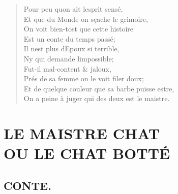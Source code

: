\documentclass[14pt,a4paper]{memoir}
\begin{document}
\begin{otherlanguage}{french}
\begin{verse}
  \small
Pour peu qu\textquotesingle on ait l\textquotesingle esprit sensé, \\
Et que du Monde on sçache le grimoire, \\
On voit bien-tost que cette histoire \\
Est un conte du temps passé; \\
Il n\textquotesingle est plus d\textquotesingle Epoux si terrible, \\
Ny qui demande l\textquotesingle impossible; \\
Fut-il mal-content \& jaloux, \\
Prés de sa femme on le voit filer doux; \\
Et de quelque couleur que sa barbe puisse estre,  \\
On a peine à juger qui des deux est le maistre.
\end{verse}

\chapter[LE MAISTRE CHAT]{LE MAISTRE CHAT \\[1EX] \large OU LE CHAT BOTTÉ}

\section{CONTE.}


\end{otherlanguage}
\end{document}
